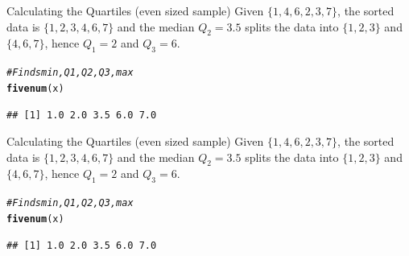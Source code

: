 \documentclass[t,xcolor=pdftex,dvipsnames,table]{beamer}
\makeatletter
\newcommand{\hlcom}[1]{\textcolor[rgb]{0.678,0.584,0.686}{\textit{#1}}}%
\newcommand{\hlstd}[1]{\textcolor[rgb]{0.345,0.345,0.345}{#1}}%
\newcommand{\hlkwd}[1]{\textcolor[rgb]{0.737,0.353,0.396}{\textbf{#1}}}%
\newenvironment{kframe}{%
 \def\at@end@of@kframe{}%
 \ifinner\ifhmode%
  \def\at@end@of@kframe{\end{minipage}}%
  \begin{minipage}{\columnwidth}%
 \fi\fi%
 \def\FrameCommand##1{\hskip\@totalleftmargin \hskip-\fboxsep
 \colorbox{shadecolor}{##1}\hskip-\fboxsep
     \hskip-\linewidth \hskip-\@totalleftmargin \hskip\columnwidth}%
 \MakeFramed {\advance\hsize-\width
   \@totalleftmargin\z@ \linewidth\hsize
   \@setminipage}}%
 {\par\unskip\endMakeFramed%
 \at@end@of@kframe}
\newenvironment{knitrout}{}{} %
\makeatother
\begin{document}
\begin{frame}[fragile]{}
\begin{block}{Calculating the Quartiles (even sized sample)}
Given $\{ 1,4,6,2,3,7\}$, the sorted data is $\{ 1,2,3,4,6,7 \}$ and the median $Q_{2} = 3.5$ splits the data into $\{ 1,2,3 \}$ and $\{ 4,6,7 \}$, hence $Q_{1} = 2$ and $Q_{3} = 6$.
\end{block}

\begin{knitrout}
\color{fgcolor}\begin{kframe}
\begin{alltt}
\hlcom{# Finds min, Q1, Q2, Q3, max}
\hlkwd{fivenum}\hlstd{(x)}
\end{alltt}
\begin{verbatim}
## [1] 1.0 2.0 3.5 6.0 7.0
\end{verbatim}
\end{kframe}
\end{knitrout}
\end{frame}

\begin{frame}[fragile]{}
\begin{block}{Calculating the Quartiles (even sized sample)}
Given $\{ 1,4,6,2,3,7\}$, the sorted data is $\{ 1,2,3,4,6,7 \}$ and the median $Q_{2} = 3.5$ splits the data into $\{ 1,2,3 \}$ and $\{ 4,6,7 \}$, hence $Q_{1} = 2$ and $Q_{3} = 6$.
\end{block}

\begin{knitrout}
\color{fgcolor}\begin{kframe}
\begin{alltt}
\hlcom{# Finds min, Q1, Q2, Q3, max}
\hlkwd{fivenum}\hlstd{(x)}
\end{alltt}
\begin{verbatim}
## [1] 1.0 2.0 3.5 6.0 7.0
\end{verbatim}
\end{kframe}
\end{knitrout}
\end{frame}
\end{document}
